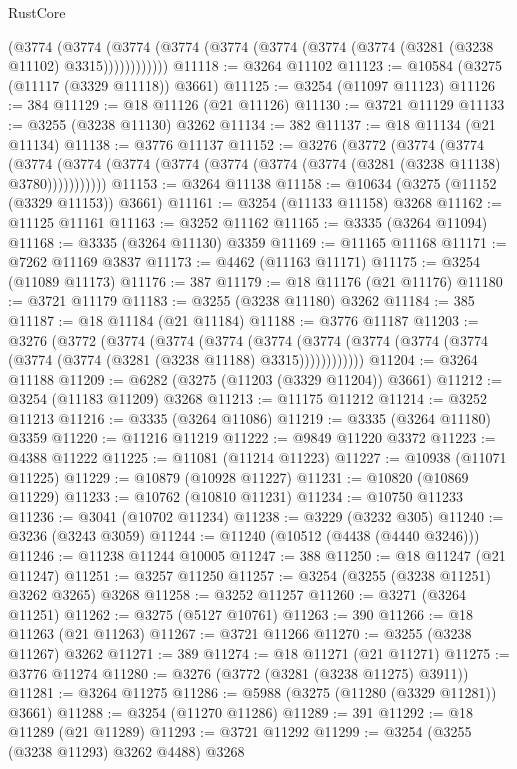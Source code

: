 \begin{lexlean}{RustCore}
\begin{coremodule}
          (@3774
            (@3774 (@3774 (@3774 (@3774 (@3774 (@3774 (@3774 (@3281 (@3238 @11102) @3315))))))))))))
@11118 := @3264 @11102
@11123 := @10584 (@3275 (@11117 (@3329 @11118)) @3661)
@11125 := @3254 (@11097 @11123)
@11126 := 384
@11129 := @18 @11126 (@21 @11126)
@11130 := @3721 @11129
@11133 := @3255 (@3238 @11130) @3262
@11134 := 382
@11137 := @18 @11134 (@21 @11134)
@11138 := @3776 @11137
@11152 := @3276
    (@3772
      (@3774
        (@3774
          (@3774 (@3774 (@3774 (@3774 (@3774 (@3774 (@3774 (@3281 (@3238 @11138) @3780)))))))))))
@11153 := @3264 @11138
@11158 := @10634 (@3275 (@11152 (@3329 @11153)) @3661)
@11161 := @3254 (@11133 @11158) @3268
@11162 := @11125 @11161
@11163 := @3252 @11162
@11165 := @3335 (@3264 @11094)
@11168 := @3335 (@3264 @11130) @3359
@11169 := @11165 @11168
@11171 := @7262 @11169 @3837
@11173 := @4462 (@11163 @11171)
@11175 := @3254 (@11089 @11173)
@11176 := 387
@11179 := @18 @11176 (@21 @11176)
@11180 := @3721 @11179
@11183 := @3255 (@3238 @11180) @3262
@11184 := 385
@11187 := @18 @11184 (@21 @11184)
@11188 := @3776 @11187
@11203 := @3276
    (@3772
      (@3774
        (@3774
          (@3774
            (@3774 (@3774 (@3774 (@3774 (@3774 (@3774 (@3774 (@3281 (@3238 @11188) @3315))))))))))))
@11204 := @3264 @11188
@11209 := @6282 (@3275 (@11203 (@3329 @11204)) @3661)
@11212 := @3254 (@11183 @11209) @3268
@11213 := @11175 @11212
@11214 := @3252 @11213
@11216 := @3335 (@3264 @11086)
@11219 := @3335 (@3264 @11180) @3359
@11220 := @11216 @11219
@11222 := @9849 @11220 @3372
@11223 := @4388 @11222
@11225 := @11081 (@11214 @11223)
@11227 := @10938 (@11071 @11225)
@11229 := @10879 (@10928 @11227)
@11231 := @10820 (@10869 @11229)
@11233 := @10762 (@10810 @11231)
@11234 := @10750 @11233
@11236 := @3041 (@10702 @11234)
@11238 := @3229 (@3232 @305)
@11240 := @3236 (@3243 @3059)
@11244 := @11240 (@10512 (@4438 (@4440 @3246)))
@11246 := @11238 @11244 @10005
@11247 := 388
@11250 := @18 @11247 (@21 @11247)
@11251 := @3257 @11250
@11257 := @3254 (@3255 (@3238 @11251) @3262 @3265) @3268
@11258 := @3252 @11257
@11260 := @3271 (@3264 @11251)
@11262 := @3275 (@5127 @10761)
@11263 := 390
@11266 := @18 @11263 (@21 @11263)
@11267 := @3721 @11266
@11270 := @3255 (@3238 @11267) @3262
@11271 := 389
@11274 := @18 @11271 (@21 @11271)
@11275 := @3776 @11274
@11280 := @3276 (@3772 (@3281 (@3238 @11275) @3911))
@11281 := @3264 @11275
@11286 := @5988 (@3275 (@11280 (@3329 @11281)) @3661)
@11288 := @3254 (@11270 @11286)
@11289 := 391
@11292 := @18 @11289 (@21 @11289)
@11293 := @3721 @11292
@11299 := @3254 (@3255 (@3238 @11293) @3262 @4488) @3268

\end{coremodule}
\end{lexlean}
